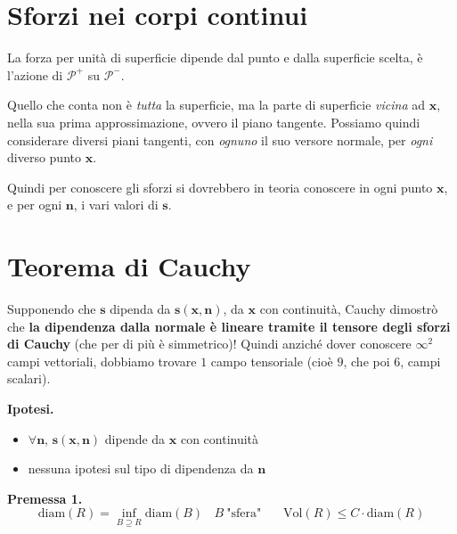 \documentclass[10pt,a4paper,twoside]{book}
\begin{document}
\section{Sforzi nei corpi continui}


La forza per unità di superficie dipende dal punto e dalla superficie scelta, è l'azione di $\mathcal{P}^{+}$ su $\mathcal{P}^{-}$.


Quello che conta non è \textit{tutta} la superficie, ma la parte di superficie \textit{vicina} ad $\mathbf{x}$, nella sua prima approssimazione, ovvero il piano tangente. Possiamo quindi considerare diversi piani tangenti, con \textit{ognuno} il suo versore normale, per \textit{ogni} diverso punto $\mathbf{x}$.


Quindi per conoscere gli sforzi si dovrebbero in teoria conoscere in ogni punto $\mathbf{x}$, e per ogni $\mathbf{n}$, i vari valori di $\mathbf{s}$.
\section{Teorema di Cauchy}

Supponendo che $\mathbf{s}$ dipenda da $\mathbf{s}(\mathbf{x} ,\mathbf{n})$, da $\mathbf{x}$ con continuità, Cauchy dimostrò che \textbf{la dipendenza dalla normale è lineare tramite il tensore degli sforzi di Cauchy} (che per di più è simmetrico)! Quindi anziché dover conoscere $\infty ^{2}$ campi vettoriali, dobbiamo trovare $1$ campo tensoriale (cioè $9$, che poi $6$, campi scalari).


\textbf{Ipotesi.}
\begin{itemize}
\item $\forall \mathbf{n}$, $\mathbf{s}(\mathbf{x} ,\mathbf{n})$ dipende da $\mathbf{x}$ con continuità
\item nessuna ipotesi sul tipo di dipendenza da $\mathbf{n}$
\end{itemize}



\textbf{Premessa 1.}
\begin{equation*}
\mathrm{diam}( R) =\inf_{B\supseteq R}\mathrm{diam}( B) \ \ \ \ B\ \text{"sfera"} \ \ \ \ \ \ \ \ \mathrm{Vol}( R) \leqslant C\cdotp \mathrm{diam}( R)
\end{equation*}
\end{document}
